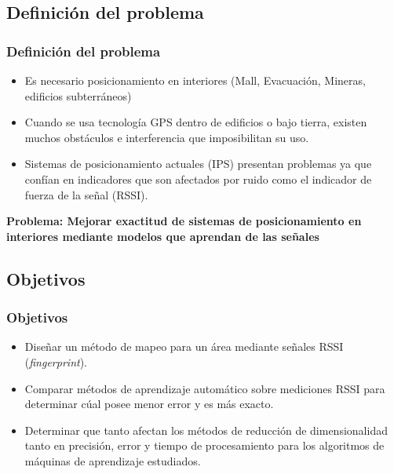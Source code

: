 \documentclass[mathserif]{beamer}
\begin{document}
\subsection{Definición del problema}

\begin{frame}
\frametitle{Definición del problema}

\begin{itemize}

\item Es necesario posicionamiento en interiores (Mall, Evacuación, Mineras, edificios subterráneos)

\pause
\item Cuando se usa tecnología GPS dentro de edificios o bajo tierra, existen muchos obstáculos e interferencia que imposibilitan su uso.

\pause
\item Sistemas de posicionamiento actuales (IPS) presentan problemas ya que confían en indicadores que son afectados por ruido como el indicador de fuerza de la señal (RSSI).

\end{itemize}

\pause
\vspace*{.5cm}
\textbf{Problema: Mejorar exactitud de sistemas de posicionamiento en interiores mediante modelos que aprendan de las señales}

\end{frame}


\subsection{Objetivos} %

\begin{frame}
\frametitle{Objetivos}

\begin{itemize}

\item Diseñar un método de mapeo para un área mediante señales RSSI (\textit{fingerprint}).
\pause
\item Comparar métodos de aprendizaje automático sobre mediciones RSSI para determinar cúal posee menor error y es más exacto.
\pause
\item Determinar que tanto afectan los métodos de reducción de dimensionalidad tanto en precisión, error y tiempo de procesamiento para los algoritmos de máquinas de aprendizaje estudiados.

\end{itemize}

\end{frame}
\end{document}
